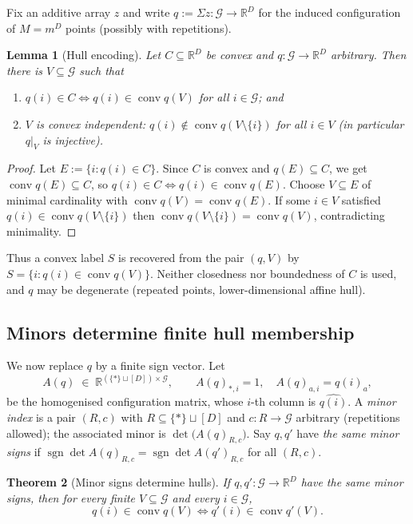 \documentclass[11pt,a4paper]{article}
\theoremstyle{plain}
\newtheorem{theorem}{Theorem}[section]
\newtheorem{lemma}[theorem]{Lemma}
\theoremstyle{definition}
\DeclareMathOperator{\conv}{conv}
\DeclareMathOperator{\sgn}{sgn}
\newcommand{\R}{\mathbb{R}}
\newcommand{\Grid}{\mathcal{G}}
\begin{document}
Fix an additive array $z$ and write $q:=\Sigma z\colon\Grid\to\R^D$ for the induced
configuration of $M=m^D$ points (possibly with repetitions).

\begin{lemma}[Hull encoding]\label{lem:hull}
Let $C\subseteq\R^D$ be convex and $q\colon\Grid\to\R^D$ arbitrary. Then there is
$V\subseteq\Grid$ such that
\begin{enumerate}
\item $q(i)\in C\iff q(i)\in\conv q(V)$ for all $i\in\Grid$; and
\item $V$ is \emph{convex independent}: $q(i)\notin\conv q(V\setminus\{i\})$ for all
      $i\in V$ (in particular $q|_V$ is injective).
\end{enumerate}
\end{lemma}

\begin{proof}
Let $E:=\{i: q(i)\in C\}$. Since $C$ is convex and $q(E)\subseteq C$, we get
$\conv q(E)\subseteq C$, so $q(i)\in C\iff q(i)\in\conv q(E)$. Choose $V\subseteq E$ of
minimal cardinality with $\conv q(V)=\conv q(E)$. If some $i\in V$ satisfied
$q(i)\in\conv q(V\setminus\{i\})$ then $\conv q(V\setminus\{i\})=\conv q(V)$, contradicting
minimality.
\end{proof}

Thus a convex label $S$ is recovered from the pair $(q,V)$ by
$S=\{i : q(i)\in\conv q(V)\}$. Neither closedness nor boundedness of $C$ is used, and $q$
may be degenerate (repeated points, lower-dimensional affine hull).

\subsection{Minors determine finite hull membership}

We now replace $q$ by a finite sign vector. Let
\[
  A(q)\;\in\;\R^{(\{\ast\}\sqcup[D])\times\Grid},
  \qquad
  A(q)_{\ast,i}=1,\quad A(q)_{a,i}=q(i)_a ,
\]
be the homogenised configuration matrix, whose $i$-th column is $\widehat{q(i)}$. A
\emph{minor index} is a pair $(R,c)$ with $R\subseteq\{\ast\}\sqcup[D]$ and
$c\colon R\to\Grid$ arbitrary (repetitions allowed); the associated minor is
$\det\bigl(A(q)_{R,c}\bigr)$. Say $q,q'$ have \emph{the same minor signs} if
$\sgn\det A(q)_{R,c}=\sgn\det A(q')_{R,c}$ for all $(R,c)$.

\begin{theorem}[Minor signs determine hulls]\label{thm:minorhull}
If $q,q'\colon\Grid\to\R^D$ have the same minor signs, then for every finite
$V\subseteq\Grid$ and every $i\in\Grid$,
\[
  q(i)\in\conv q(V)\iff q'(i)\in\conv q'(V).
\]
\end{theorem}
\end{document}
